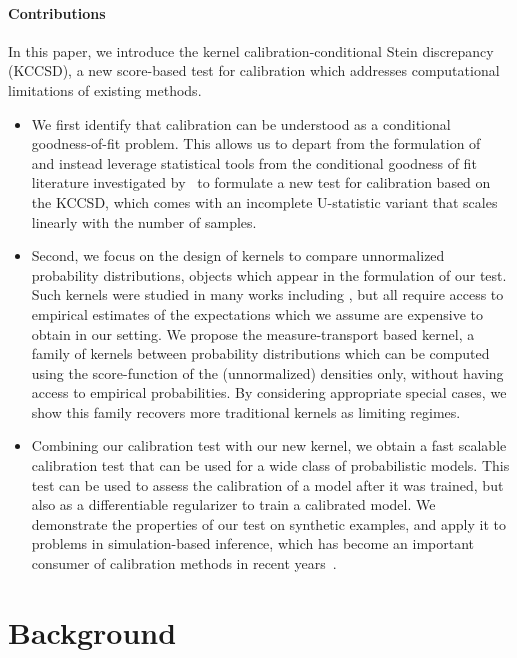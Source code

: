 \documentclass{uai2023} %
\begin{document}
\paragraph{Contributions} 

In this paper, we introduce the kernel calibration-conditional Stein discrepancy (KCCSD), a new score-based test for
calibration which addresses computational limitations of existing methods.
\begin{itemize}
    \item We first identify that calibration can be understood as a conditional goodness-of-fit problem. This allows us
        to depart from the formulation of~\citet{widmann2022calibration} and
        instead leverage statistical tools from the conditional goodness of fit
        literature investigated by~\citet{jitkrittum2020testing} to formulate a
        new test for calibration based on the KCCSD, which comes with an incomplete
        U-statistic variant that scales linearly with the number of samples.
    \item Second, we focus on the design of kernels to compare unnormalized
        probability distributions, objects which appear in the formulation of our test.
        Such kernels were studied in many works including
        \cite{DBLP:conf/icml/MeunierPC22}, but all require access to empirical
        estimates of the expectations which we assume are expensive to obtain in our setting.
        We propose the measure-transport based kernel, a family of kernels between probability distributions which can be computed using the score-function of the (unnormalized) densities only, without having access to empirical probabilities.
        By considering appropriate special cases, 
        we show this family recovers more traditional kernels as limiting regimes.
    \item Combining our calibration test with our new kernel, we obtain a fast
        scalable calibration test that can be used for a wide class of
        probabilistic models. This test can be used to assess the calibration
        of a model after it was trained, but also as a differentiable
        regularizer to train a calibrated model. We demonstrate the properties
        of our test on synthetic examples, and apply it to problems in
        simulation-based inference, which has become an important consumer of
        calibration methods in recent years~\citep{Hermans2021,delaunoy2022towards}.
\end{itemize}


\section{Background}\label{sec:background}
\end{document}

